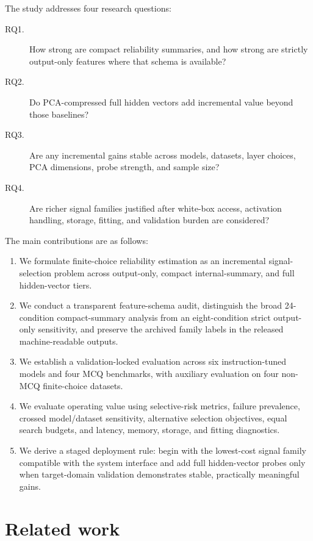 \documentclass[preprint,12pt,authoryear]{elsarticle}
\begin{document}
The study addresses four research questions:
\begin{description}
    \item[RQ1.] How strong are compact reliability summaries, and how strong are strictly output-only features where that schema is available?
    \item[RQ2.] Do PCA-compressed full hidden vectors add incremental value beyond those baselines?
    \item[RQ3.] Are any incremental gains stable across models, datasets, layer choices, PCA dimensions, probe strength, and sample size?
    \item[RQ4.] Are richer signal families justified after white-box access, activation handling, storage, fitting, and validation burden are considered?
\end{description}

The main contributions are as follows:
\begin{enumerate}
    \item We formulate finite-choice reliability estimation as an incremental signal-selection problem across output-only, compact internal-summary, and full hidden-vector tiers.
    \item We conduct a transparent feature-schema audit, distinguish the broad 24-condition compact-summary analysis from an eight-condition strict output-only sensitivity, and preserve the archived family labels in the released machine-readable outputs.
    \item We establish a validation-locked evaluation across six instruction-tuned models and four MCQ benchmarks, with auxiliary evaluation on four non-MCQ finite-choice datasets.
    \item We evaluate operating value using selective-risk metrics, failure prevalence, crossed model/dataset sensitivity, alternative selection objectives, equal search budgets, and latency, memory, storage, and fitting diagnostics.
    \item We derive a staged deployment rule: begin with the lowest-cost signal family compatible with the system interface and add full hidden-vector probes only when target-domain validation demonstrates stable, practically meaningful gains.
\end{enumerate}

\section{Related work}
\end{document}
